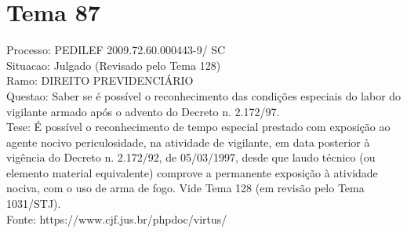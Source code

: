 \documentclass[12pt]{article}
\begin{document}
\section*{Tema 87}
Processo: PEDILEF 2009.72.60.000443-9/ SC\\
Situacao: Julgado (Revisado pelo Tema 128)\\
Ramo: DIREITO PREVIDENCIÁRIO\\
Questao: Saber se é possível o reconhecimento das condições especiais do labor do vigilante armado após o advento do Decreto n. 2.172/97.\\
Tese: É possível o reconhecimento de tempo especial prestado com exposição ao agente nocivo periculosidade, na atividade de vigilante, em data posterior à vigência do Decreto n. 2.172/92, de 05/03/1997, desde que laudo técnico (ou elemento material equivalente) comprove a permanente exposição à atividade nociva, com o uso de arma de fogo. Vide Tema 128 (em revisão pelo Tema 1031/STJ).\\
Fonte: https://www.cjf.jus.br/phpdoc/virtus/
\end{document}
